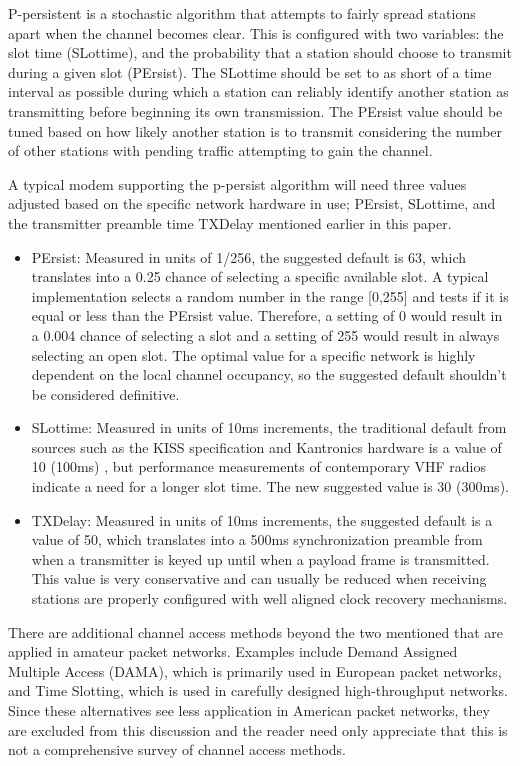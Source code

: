 \documentclass[12pt,letterpaper]{article}
\begin{document}
P-persistent is a stochastic algorithm that attempts to fairly spread
stations apart when the channel becomes clear. 
This is configured with two variables: the slot time (SLottime), and the
probability that a station should choose to transmit during a given slot (PErsist). 
The SLottime
should be set to as short of a time interval as possible during which a station can
reliably identify another station as transmitting 
before beginning its own transmission.
The PErsist value should be tuned based on how likely another station is to transmit 
considering the number of other stations with 
pending traffic attempting to gain the channel.

A typical modem supporting the p-persist algorithm will need three values adjusted
based on the specific network hardware in use; PErsist, SLottime, and the 
transmitter preamble time TXDelay mentioned earlier in this paper.

\begin{itemize}
	\item PErsist: Measured in units of 1/256, the suggested default is
		63, which translates into a 0.25 chance of selecting a specific available
		slot. A typical implementation selects a random number in the range
		[0,255] and tests if it is equal or less than the PErsist value.
		Therefore, a setting of 0 would result in a 0.004 chance of selecting 
		a slot and a setting of 255 would result in always selecting an open slot.
		The optimal value for a specific network is highly dependent on the
		local channel occupancy, so the suggested default shouldn't
		be considered definitive.
	\item SLottime: Measured in units of 10ms increments, the traditional
		default from sources such as the KISS specification and 
		Kantronics hardware 
		is a value of 10 (100ms) \cite{KISSspec}\cite{kamplusref}, 
		but performance measurements of contemporary VHF radios 
		indicate a need for a longer slot time. 
		The new suggested value is 30 (300ms).
	\item TXDelay: Measured in units of 10ms increments, the suggested
		default is a value of 50, which translates into a 500ms synchronization
		preamble from when a transmitter is keyed up until when a payload
		frame is transmitted.
		This value is very conservative and can usually be reduced when
		receiving stations are properly configured with
		well aligned clock recovery mechanisms.
\end{itemize}

There are additional channel access methods beyond the two mentioned
that are applied in amateur packet networks. 
Examples include Demand Assigned Multiple Access (DAMA),
which is primarily used in European packet networks,
and Time Slotting, which is used in carefully designed high-throughput networks.
Since these alternatives see less application in American packet networks,
they are excluded from this discussion and the reader need only appreciate that
this is not a comprehensive survey of channel access methods.
\end{document}
